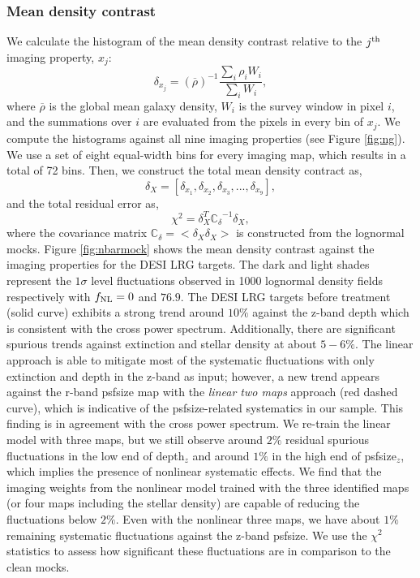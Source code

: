 \subsubsection{Mean density contrast}
We calculate the histogram of the mean density contrast relative to the $j^{\rm th}$ imaging property, $x_{j}$:
\begin{equation}
\delta_{x_{j}} = ({\overline{\rho}})^{-1} \frac{\sum_{i} \rho_{i} W_{i}}{\sum_{i} W_{i}},
\end{equation}
where $\overline{\rho}$ is the global mean galaxy density, $W_{i}$ is the survey window in pixel $i$, and the summations over $i$ are evaluated from the pixels in every bin of $x_{j}$. We compute the histograms against all nine imaging properties (see Figure \ref{fig:ng}). We use a set of eight equal-width bins for every imaging map, which results in a total of 72 bins. Then, we construct the total mean density contract as,
\begin{equation}
\delta_{X} = [\delta_{x_{1}}, \delta_{x_{2}}, \delta_{x_{3}}, ..., \delta_{x_{9}}],
\end{equation}
and the total residual error as,
\begin{equation}
\chi^{2} = \delta_{X}^{T} \mathbb{C_{\delta}}^{-1} \delta_{X},
\end{equation}
where the covariance matrix $\mathbb{C}_{\delta} = < \delta_{X} \delta_{X}>$ is constructed from the lognormal mocks. Figure \ref{fig:nbarmock} shows the mean density contrast against the imaging properties for the DESI LRG targets. The dark and light shades represent the $1\sigma$ level fluctuations observed in 1000 lognormal density fields respectively with $f_{\rm NL}=0$ and $76.9$. The DESI LRG targets before treatment (solid curve) exhibits a strong trend around $10\%$ against the z-band depth which is consistent with the cross power spectrum. Additionally, there are significant spurious trends against extinction and stellar density at about $5-6\%$. The linear approach is able to mitigate most of the systematic fluctuations with only extinction and depth in the z-band as input; however, a new trend appears against the r-band psfsize map with the \textit{linear two maps} approach (red dashed curve), which is indicative of the psfsize-related systematics in our sample. This finding is in agreement with the cross power spectrum. We re-train the linear model with three maps, but we still observe around $2\%$ residual spurious fluctuations in the low end of depth$_{z}$ and around $1\%$ in the high end of psfsize$_{z}$, which implies the presence of nonlinear systematic effects. We find that the imaging weights from the nonlinear model trained with the three identified maps (or four maps including the stellar density) are capable of reducing the fluctuations below $2\%$. Even with the nonlinear three maps, we have about $1\%$ remaining systematic fluctuations against the z-band psfsize. We use the $\chi^{2}$ statistics to assess how significant these fluctuations are in comparison to the clean mocks. 

